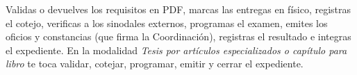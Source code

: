 \documentclass[11pt,a4paper]{article}
\begin{document}
{\small\tableofcontents}
\newpage
\begin{quevasahacer}
Validas o devuelves los requisitos en PDF, marcas las entregas en físico, registras el cotejo, verificas a los sinodales externos, programas el examen, emites los oficios y constancias (que firma la Coordinación), registras el resultado e integras el expediente. En la modalidad \emph{Tesis por artículos especializados o capítulo para libro} te toca validar, cotejar, programar, emitir y cerrar el expediente.
\end{quevasahacer}




\end{document}
